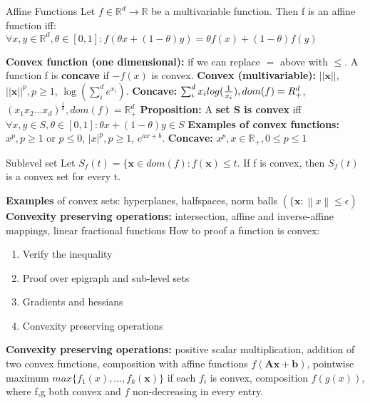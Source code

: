 \documentclass[a4paper]{article}
\begin{document}
\begin{mainbox}{Affine Functions}
    Let $f\in\mathbb{R}^d \to \mathbb{R}$ be a multivariable function. Then f is an affine function iff:
    $
    \forall x,y\in \mathbb{R}^d, \theta \in [0,1]: f(\theta x + (1-\theta)y) = \theta f(x) + (1-\theta)f(y)
    $
\end{mainbox}
\textbf{Convex function (one dimensional):} if we can replace $=$ above with $\leq$. A function f is \textbf{concave}  if $-f(x)$ is convex.
\newline
\textbf{Convex (multivariable):} $||\mathbf{x}||$, $||\mathbf{x}||^p, p\geq1$, $\log(\sum_i^d e^{x_i})$. \textbf{Concave:} $\sum_i^d x_i log(\frac{1}{x_i}), \newline
dom(f)=R^d_+$, $(x_1 x_2 \dots x_d)^\frac{1}{d}, dom(f)= \mathbb{R}^d_+$      
\newline
\textbf{Proposition:} A \textbf{set S is convex} iff $\forall x,y\in S, \theta\in[0,1]: \theta x + (1-\theta)y \in S$
\newline
\textbf{Examples of convex functions: } $x^p, p \geq 1$ or $p \leq 0$, $|x|^p, p\geq 1$, $e^{ax+b}$. \textbf{Concave:} $x^p, x\in \mathbb{R}_+, 0\leq p \leq 1$        
\begin{subbox}{Sublevel set}
    Let $S_f(t) = \{\mathbf{x} \in dom(f): f(\mathbf{x}) \leq t$. If f is convex, then $S_f(t)$ is a convex set for every t.  
\end{subbox}

\textbf{Examples}  of convex sets: hyperplanes, halfspaces, norm balls $(\{ \mathbf{x}: \left\lVert x \right\rVert \leq \epsilon )$ %
\newline
\textbf{Convexity preserving operations:} intersection, affine and inverse-affine mappings, linear fractional functions 
\newline
How to proof a function is convex:
\begin{enumerate}
    \item Verify the inequality
    \item Proof over epigraph and sub-level sets
    \item Gradients and hessians
    \item Convexity preserving operations
\end{enumerate}
\textbf{Convexity preserving operations:} positive scalar multiplication, addition of two convex functions, composition with affine functions $f(\mathbf{Ax+b})$, pointwise maximum $max\{f_1(x), \dots, f_k(\mathbf{x})\}$ if each $f_i$ is convex, composition $f(g(x))$, where f,g both convex and $f$ non-decreasing in every entry.
\end{document}
